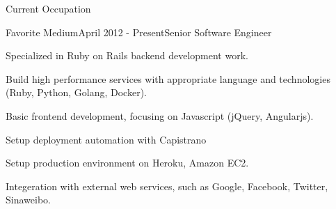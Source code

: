 \documentclass{resume} %
\begin{document}
\begin{rSection}{Current Occupation}

\begin{rSubsection}{Favorite Medium}{April 2012 - Present}{Senior Software Engineer}{}{}
\begin{rSubsectionList}
\item Specialized in Ruby on Rails backend development work.
\item Build high performance services with appropriate language and technologies (Ruby, Python, Golang, Docker).
\item Basic frontend development, focusing on Javascript (jQuery, Angularjs).
\item Setup deployment automation with Capistrano
\item Setup production environment on Heroku, Amazon EC2.
\item Integeration with external web services, such as Google, Facebook, Twitter, Sinaweibo.
\end{rSubsectionList}
\end{rSubsection}
\end{rSection}
\end{document}

